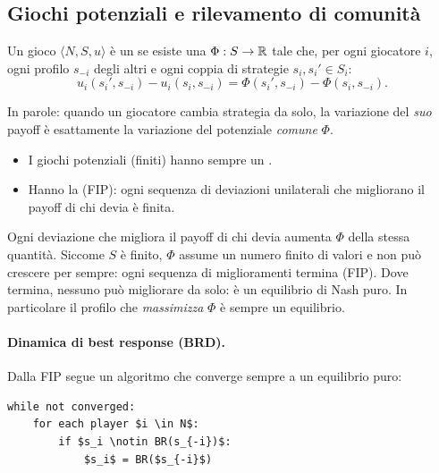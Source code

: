 \subsection{Giochi potenziali e rilevamento di comunità}

\begin{definizione}
Un gioco $\langle N, S, u\rangle$ è un  se esiste una
 $\Phi : S \to \mathbb{R}$ tale che, per ogni giocatore $i$, ogni profilo
$s_{-i}$ degli altri e ogni coppia di strategie $s_i, s_i' \in S_i$:
\[
  u_i(s_i', s_{-i}) - u_i(s_i, s_{-i}) = \Phi(s_i', s_{-i}) - \Phi(s_i, s_{-i}).
\]
\end{definizione}
In parole: quando un giocatore cambia strategia da solo, la variazione del \emph{suo} payoff
è esattamente la variazione del potenziale \emph{comune} $\Phi$.
\begin{itemize}
  \item I giochi potenziali (finiti) hanno sempre un .
  \item Hanno la  (FIP): ogni sequenza di
        deviazioni unilaterali che migliorano il payoff di chi devia è finita.
\end{itemize}

\begin{extra}
Ogni deviazione che migliora il payoff di chi devia aumenta $\Phi$ della stessa quantità.
Siccome $S$ è finito, $\Phi$ assume un numero finito di valori e non può crescere per
sempre: ogni sequenza di miglioramenti termina (FIP). Dove termina, nessuno può migliorare
da solo: è un equilibrio di Nash puro. In particolare il profilo che \emph{massimizza}
$\Phi$ è sempre un equilibrio.
\end{extra}

\paragraph{Dinamica di best response (BRD).}
Dalla FIP segue un algoritmo che converge sempre a un equilibrio puro:
\begin{lstlisting}[style=pseudo]
while not converged:
    for each player $i \in N$:
        if $s_i \notin BR(s_{-i})$:
            $s_i$ = BR($s_{-i}$)
\end{lstlisting}

